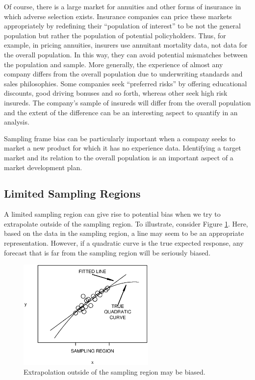 Of course, there is a large market for annuities and other forms of
insurance in which adverse selection exists. Insurance companies can
price these markets appropriately by redefining their ``population
of interest'' to be not the general population but rather the
population of potential policyholders. Thus, for example, in pricing
annuities, insurers use annuitant mortality data, not data for the
overall population. In this way, they can avoid potential mismatches
between the population and sample. More generally, the experience of
almost any company differs from the overall population due to
underwriting standards and sales philosophies. Some companies seek
``preferred risks'' by offering educational discounts, good driving
bonuses and so forth, whereas other seek high risk insureds. The
company's sample of insureds will differ from the overall population
and the extent of the difference can be an interesting aspect to
quantify in an analysis.

Sampling frame bias can be particularly important when a company
seeks to market a new product for which it has no experience data.
Identifying a target market and its relation to the overall
population is an important aspect of a market development plan.



\subsection{Limited Sampling Regions}


A limited sampling region can give rise to potential bias when we
try to extrapolate outside of the sampling region. To illustrate,
consider Figure \ref{F6:Extrapolation}. Here, based on the data in
the sampling region, a line may seem to be an appropriate
representation. However, if a quadratic curve is the true expected
response, any forecast that is far from the sampling region will be
seriously biased.


\begin{figure}[htp]
  \begin{center}
    \includegraphics[width=0.6\textwidth]{Chapter6/F6Extrapolation.eps}
    \caption{\label{F6:Extrapolation} \small  Extrapolation outside
of the sampling region may be biased.}
  \end{center}
\end{figure}

